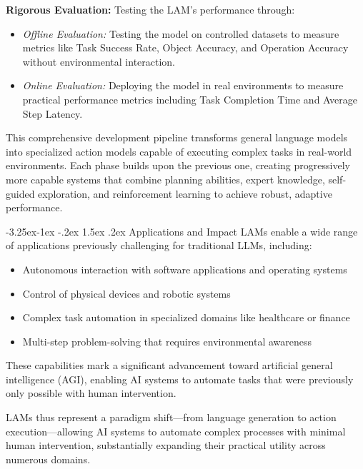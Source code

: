 \documentclass[journal,twoside,10pt]{IEEEtran}
\makeatletter
\renewcommand\subsection{\@startsection{subsection}{2}{\z@}%
                       {-3.25ex\@plus -1ex \@minus -.2ex}%
                       {1.5ex \@plus .2ex}%
                       {\normalfont\large\bfseries}}
\makeatother
\begin{document}
\textbf{Rigorous Evaluation:} Testing the LAM's performance through:
\begin{itemize}
    \item \textit{Offline Evaluation:} Testing the model on controlled datasets to measure metrics like Task Success Rate, Object Accuracy, and Operation Accuracy without environmental interaction.
    \item \textit{Online Evaluation:} Deploying the model in real environments to measure practical performance metrics including Task Completion Time and Average Step Latency.
\end{itemize}



This comprehensive development pipeline transforms general language models into specialized action models capable of executing complex tasks in real-world environments. Each phase builds upon the previous one, creating progressively more capable systems that combine planning abilities, expert knowledge, self-guided exploration, and reinforcement learning to achieve robust, adaptive performance.

\subsection{Applications and Impact}
LAMs enable a wide range of applications previously challenging for traditional LLMs, including:

\begin{itemize}
    \item Autonomous interaction with software applications and operating systems
    \item Control of physical devices and robotic systems
    \item Complex task automation in specialized domains like healthcare or finance
    \item Multi-step problem-solving that requires environmental awareness
\end{itemize}

These capabilities mark a significant advancement toward artificial general intelligence (AGI), enabling AI systems to automate tasks that were previously only possible with human intervention.

LAMs thus represent a paradigm shift—from language generation to action execution—allowing AI systems to automate complex processes with minimal human intervention, substantially expanding their practical utility across numerous domains.
\end{document}
